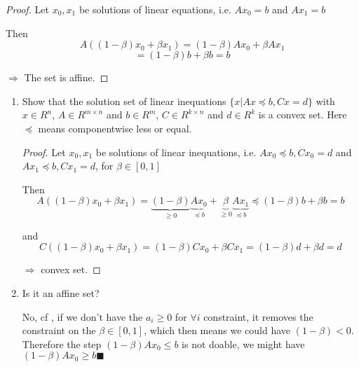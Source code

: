 

\begin{proof}
    Let $x_0, x_1$ be solutions of linear equations, i.e. $A x_0 = b$ and $A x_1 = b$

    Then $$A((1-\beta)x_0 + \beta x_1) = (1-\beta) A x_0 + \beta A x_1$$$$ = (1-\beta)b + \beta b = b$$

    $\Rightarrow$ The set is affine.
\end{proof}



\bigskip
\bigskip
{}

\begin{enumerate}
    \questioncolor
    \item Show that the solution set of linear inequations $\{x | Ax \preceq b, Cx = d\}$ with $x \in R^n$, $A \in R^{m×n}$ and $b \in R^m$, $C \in R^{k×n}$ and $d \in R^k$ is a convex set. Here $\preceq$ means componentwise less or equal. \normalcolor

    \begin{proof}
        Let $x_0, x_1$ be solutions of linear inequations, i.e. $A x_0 \preceq b, C x_0 = d$ and $A x_1 \preceq b, C x_1 = d$, for $\beta \in [0, 1]$

        Then
        \begin{equation}\label{eq:eq1}
            A((1-\beta)x_0 + \beta x_1) = \underbrace{(1-\beta)}_\text{$\ge 0$} \underbrace{A x_0}_\text{$\preceq b$} + \underbrace{\beta}_\text{$\ge 0$} \underbrace{A x_1}_\text{$\preceq b$} \preceq (1-\beta) b + \beta b = b
        \end{equation}

        and $$C((1-\beta) x_0 + \beta x_1) = (1-\beta) C x_0 + \beta C x_1 = (1-\beta) d + \beta d = d$$

        $\Rightarrow$ convex set.
    \end{proof}



    \questioncolor
    \item Is it an affine set? \normalcolor

    No, cf , if we don't have the $a_i \ge 0$ for $\forall i$ constraint, it removes the constraint on the $\beta \in [0,1]$, which then means we could have $(1-\beta) < 0$. Therefore the step $(1-\beta)Ax_0 \le b$ is not doable, we might have $(1-\beta)Ax_0 \ge b$\hfill $\blacksquare$
\end{enumerate}




